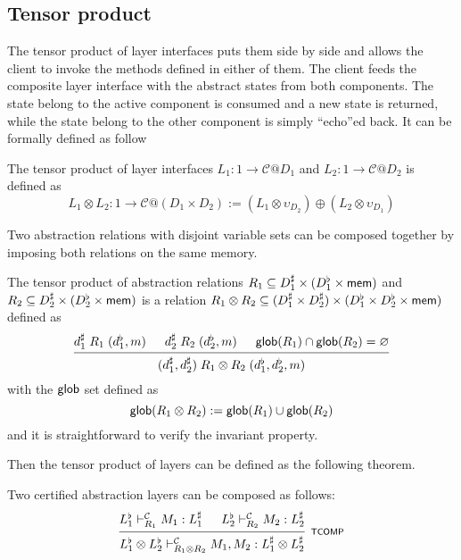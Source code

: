 \documentclass[acmsmall,review,anonymous]{acmart}\settopmatter{printfolios=true,printccs=false,printacmref=false}
\begin{document}

\subsection{Tensor product} %
\label{sec:ccal:tcomp}
The tensor product of layer interfaces
puts them side by side
and allows the client
to invoke the methods
defined in either of them.
The client feeds the composite layer interface
with the abstract states from both components.
The state belong to the active component
is consumed
and a new state is returned,
while the state belong to the other component
is simply ``echo''ed back.
It can be formally defined as follow

\begin{definition}
  The tensor product of layer interfaces
  $L_1 : 1 \rightarrow \mathcal{C}@D_1$
  and
  $L_2 : 1 \rightarrow \mathcal{C}@D_2$
  is defined as
  \[
    L_1 \otimes L_2 : 1 \rightarrow \mathcal{C}@(D_1 \times D_2) :=
    (L_1 \otimes \upsilon_{D_2}) \oplus
    (L_2 \otimes \upsilon_{D_1})
  \]
\end{definition}

Two abstraction relations with disjoint variable sets
can be composed together
by imposing both relations on the same memory.

\begin{definition}
  The tensor product of abstraction relations
  $R_1 \subseteq D_1^\sharp \times (D_1^\flat \times  \mathsf{mem} )$
  and
  $R_2 \subseteq D_2^\sharp \times (D_2^\flat \times  \mathsf{mem} )$
  is a relation
  $R_1 \otimes R_2 \subseteq (D_1^\sharp \times D_2^\sharp)
  \times (D_1^\flat \times D_2^\flat \times  \mathsf{mem} )$
  defined as
  \[
    \begin{prooftree}
      \hypo{d_1^\sharp \mathrel{R_1} (d_1^\flat, m)}
      \hypo{d_2^\sharp \mathrel{R_2} (d_2^\flat, m)}
      \hypo{\kw{glob}(R_1) \cap \kw{glob}(R_2) = \varnothing}
      \infer3{(d_1^\sharp,d_2^\sharp)
        \mathrel{R_1\otimes R_2} (d_1^\flat,d_2^\flat,m)}
    \end{prooftree}
  \]
  with the $ \mathsf{glob} $ set defined as
  \[
     \mathsf{glob} (R_1\otimes R_2) :=  \mathsf{glob} (R_1) \cup  \mathsf{glob} (R_2)
  \]
  and it is straightforward to verify
  the invariant property.
\end{definition}

Then the tensor product of layers can be defined
as the following theorem.

\begin{theorem}
  Two certified abstraction layers can be
  composed as follows:
  \[
    \begin{prooftree}
      \hypo{L_1^\flat \vdash^\mathcal{C}_{R_1} M_1 : L_1^\sharp}
      \hypo{L_2^\flat \vdash^\mathcal{C}_{R_2} M_2 : L_2^\sharp}
      \infer2[\scriptsize\kw{TCOMP}]{L_1^\flat \otimes L_2^\flat
        \vdash^\mathcal{C}_{R_1 \otimes R_2}
        M_1, M_2 : L_1^\sharp \otimes L_2^\sharp}
    \end{prooftree}
  \]
\end{theorem}
\end{document}
